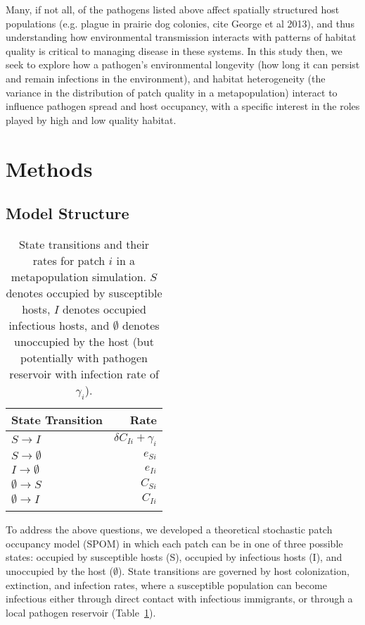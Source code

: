 \documentclass{svjour3}
\begin{document}
Many, if not all, of the pathogens listed above affect spatially structured host populations (e.g. plague in prairie dog colonies, cite George et al 2013), and thus understanding how environmental transmission interacts with patterns of habitat quality is critical to managing disease in these systems.  In this study then, we seek to explore how a pathogen's environmental longevity (how long it can persist and remain infections in the environment), and habitat heterogeneity (the variance in the distribution of patch quality in a metapopulation) interact to influence pathogen spread and host occupancy, with a specific interest in the roles played by high and low quality habitat.  

\section{Methods}
\label{methods}

\subsection{Model Structure}

\begin{table}
\caption{State transitions and their rates for patch $i$ in a metapopulation simulation.  $S$ denotes occupied by  susceptible hosts, $I$ denotes occupied infectious hosts, and $\emptyset$ denotes unoccupied by the host (but potentially with pathogen reservoir with infection rate of $\gamma_i$).}
\begin{tabular}{lr}
State Transition & Rate \\
\hline
$S \rightarrow I$ & $\delta C_{Ii} + \gamma_i$\\
$S \rightarrow \emptyset $ & $e_{Si}$\\
$I \rightarrow \emptyset $ & $e_{Ii}$ \\
$\emptyset \rightarrow S$ & $C_{Si}$\\
$\emptyset \rightarrow I$ & $C_{Ii}$\\
\label{transitions}
\end{tabular}
\end{table}

To address the above questions, we developed a theoretical stochastic patch occupancy model (SPOM) in which each patch can be in one of three possible states: occupied by susceptible hosts (S), occupied by infectious hosts (I), and unoccupied by the host ($\emptyset$).  State transitions are governed by host colonization, extinction, and infection rates, where a susceptible population can become infectious either through direct contact with infectious immigrants, or through a local pathogen reservoir (Table~\ref{transitions}).
\end{document}
